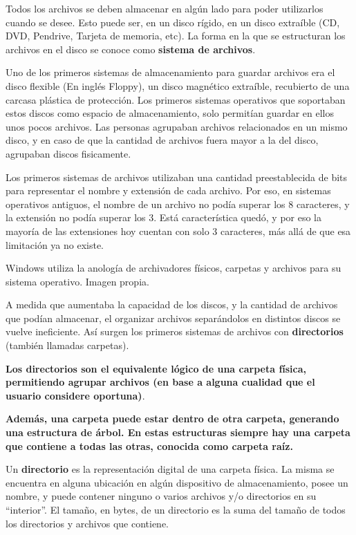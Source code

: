 Todos los archivos se deben almacenar en algún lado para poder utilizarlos
cuando se desee. Esto puede ser, en un disco rígido, en un disco extraíble (CD,
DVD, Pendrive, Tarjeta de memoria, etc). La forma en la que se estructuran los
archivos en el disco se conoce como \textbf{sistema de archivos}.

Uno de los primeros sistemas de almacenamiento para guardar archivos era el
disco flexible (En inglés Floppy), un disco magnético extraíble, recubierto de
una carcasa plástica de protección. Los primeros sistemas operativos que
soportaban estos discos como espacio de almacenamiento, solo permitían guardar
en ellos unos pocos archivos. Las personas agrupaban archivos relacionados en un
mismo disco, y en caso de que la cantidad de archivos fuera mayor a la del
disco, agrupaban discos fisicamente.

\begin{knowwhat}
Los primeros sistemas de archivos utilizaban una cantidad preestablecida de bits
para representar el nombre y extensión de cada archivo. Por eso, en sistemas
operativos antiguos, el nombre de un archivo no podía superar los 8 caracteres,
y la extensión no podía superar los 3. Está característica quedó, y por eso la
mayoría de las extensiones hoy cuentan con solo 3 caracteres, más allá de que
esa limitación ya no existe.
\end{knowwhat}

{Windows utiliza la anología de archivadores físicos, carpetas y archivos para
su sistema operativo.} {Imagen propia.}

A medida que aumentaba la capacidad de los discos, y la cantidad de archivos que
podían almacenar, el organizar archivos separándolos en distintos discos se
vuelve ineficiente. Así surgen los primeros sistemas de archivos con
\textbf{directorios} (también llamadas carpetas).

\textbf{Los directorios son el equivalente lógico de una carpeta física,
permitiendo agrupar archivos (en base a alguna cualidad que el usuario considere
oportuna)}.

\textbf{Además, una carpeta puede estar dentro de otra carpeta, generando una
estructura de árbol. En estas estructuras siempre hay una carpeta que contiene a
todas las otras, conocida como carpeta raíz.}

\begin{definition} Un \textbf{directorio} es la representación
    digital de una carpeta física. La misma se encuentra en alguna ubicación en
    algún dispositivo de almacenamiento, posee un nombre, y puede contener
    ninguno o varios archivos y/o directorios en su ``interior''. El tamaño, en
    bytes, de un directorio es la suma del tamaño de todos los directorios y
    archivos que contiene.\autocite[part. IV]{gookin_2005}
\end{definition}

